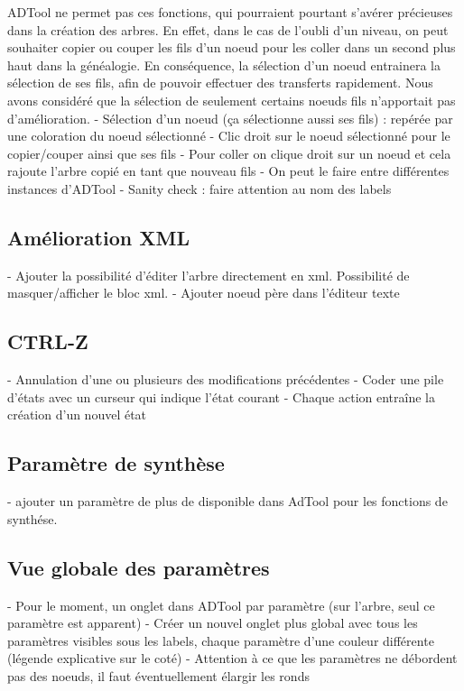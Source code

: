 	ADTool ne permet pas ces fonctions, qui pourraient pourtant s'avérer précieuses dans la création des arbres. En effet, dans le cas de l'oubli d'un niveau, on peut souhaiter copier ou couper les fils d'un noeud pour les coller dans un second plus haut dans la généalogie.
	En conséquence, la sélection d'un noeud entrainera la sélection de ses fils, afin de pouvoir effectuer des transferts rapidement. Nous avons considéré que la sélection de seulement certains noeuds fils n'apportait pas d'amélioration.
	- Sélection d'un noeud (ça sélectionne aussi ses fils) : repérée par une coloration du noeud sélectionné
	- Clic droit sur le noeud sélectionné pour le copier/couper ainsi que ses fils
	- Pour coller on clique droit sur un noeud et cela rajoute l'arbre copié en tant que nouveau fils
	- On peut le faire entre différentes instances d'ADTool
	- Sanity check : faire attention au nom des labels

	\subsection{Amélioration XML}

	- Ajouter la possibilité d'éditer l'arbre directement en xml. Possibilité de masquer/afficher le bloc xml.
	- Ajouter noeud père dans l'éditeur texte 
	
	\subsection{CTRL-Z}

	- Annulation d'une ou plusieurs des modifications précédentes
	- Coder une pile d'états avec un curseur qui indique l'état courant
	- Chaque action entraîne la création d'un nouvel état
	
	\subsection{Paramètre de synthèse}
	- ajouter un paramètre de plus de disponible dans AdTool pour les fonctions de synthése.
		
	\subsection{Vue globale des paramètres}

	- Pour le moment, un onglet dans ADTool par paramètre (sur l'arbre, seul ce paramètre est apparent)	
	- Créer un nouvel onglet plus global avec tous les paramètres visibles sous les labels, chaque paramètre d'une couleur différente (légende explicative sur le coté)
	- Attention à ce que les paramètres ne débordent pas des noeuds, il faut éventuellement élargir les ronds